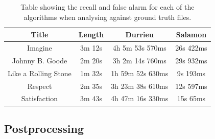\begin{table}
\begin{center}
\begin{tabular} {| c | c | c | c |} \hline
Title 							& Length 		& Durrieu  						& Salamon  	\\ \hline \hline
Imagine						& 3m 12s		&	4h 5m 53s 570ms 		& 26s 422ms		\\	\hline
Johnny B. Goode		& 2m 20s		&	3h 2m 14s 760ms		& 29s 932ms		\\ 	\hline
Like a Rolling Stone	& 1m 32s		&	1h 59m 52s 630ms		& 9s 193ms		\\ 	\hline
Respect						& 2m 35s		&	3h 23m 38s 610ms		& 12s 597ms		\\ 	\hline
Satisfaction				& 3m 43s		& 	4h 47m 16s 330ms		& 15s 65ms		\\	\hline
\end{tabular}
\caption{Table showing the recall and false alarm for each of the algorithms when analysing against ground truth files.}
\label{table:melodytiming}
\end{center}
\end{table}

\vspace{10pt}


\subsection{Postprocessing}


